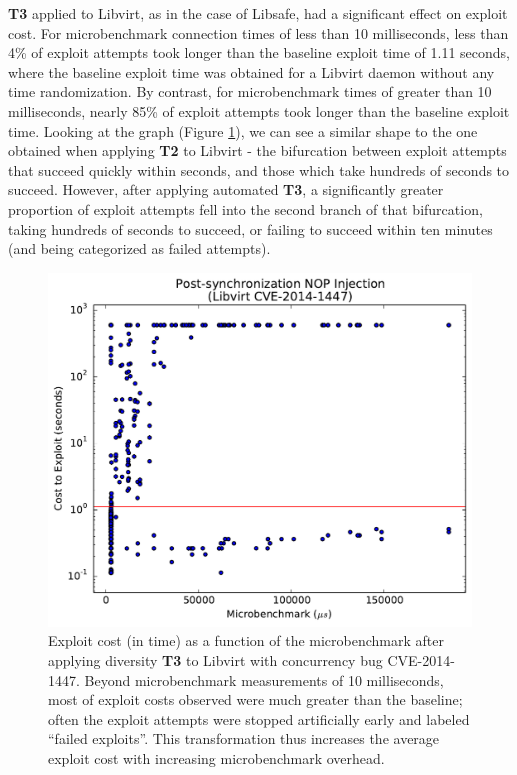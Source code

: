 \textbf{T3} applied to Libvirt, as in the case of Libsafe, had a significant effect on exploit cost.
For microbenchmark connection times of less than 10 milliseconds, less than 4\% of exploit attempts took longer than the baseline exploit time of 1.11 seconds, where the baseline exploit time was obtained for a Libvirt daemon without any time randomization.
By contrast, for microbenchmark times of greater than 10 milliseconds, nearly 85\% of exploit attempts took longer than the baseline exploit time.
Looking at the graph (Figure \ref{fig_libvirt-post}), we can see a similar shape to the one obtained when applying \textbf{T2} to Libvirt - the bifurcation between exploit attempts that succeed quickly within seconds, and those which take hundreds of seconds to succeed.
However, after applying automated \textbf{T3}, a significantly greater proportion of exploit attempts fell into the second branch of that bifurcation, taking hundreds of seconds to succeed, or failing to succeed within ten minutes (and being categorized as failed attempts).
\begin{figure}
	\centering
	\includegraphics[width=.75\columnwidth]{figures/libvirt-post}
	\caption{
		Exploit cost (in time) as a function of the microbenchmark after applying diversity \textbf{T3} to Libvirt with concurrency bug CVE-2014-1447.
		Beyond microbenchmark measurements of 10 milliseconds, most of exploit costs observed were much greater than the baseline; often the exploit attempts were stopped artificially early and labeled ``failed exploits''.
		This transformation thus increases the average exploit cost with increasing microbenchmark overhead.
	}
	\label{fig_libvirt-post}
\end{figure}

